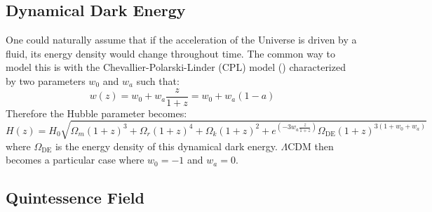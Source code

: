 \subsection{Dynamical Dark Energy}

One could naturally assume that if the acceleration of the Universe is driven by a fluid, its energy density would change throughout time. The common way to model this 
is with the Chevallier-Polarski-Linder (CPL) model (\cite{Chevallier_2001}) characterized by two parameters $w_0$ and $w_a$ such that:
\begin{equation}
    w(z) = w_0 + w_a \frac{z}{1+z} = w_0 + w_a(1-a)
\end{equation}
Therefore the Hubble parameter becomes:
\begin{equation}
    H(z) = H_0 \sqrt{\Omega_m(1+z)^3 + \Omega_r(1+z)^4 + \Omega_k(1+z)^2 + e^{\left( -3w_a\frac{z}{1+z} \right)} \Omega_{\text{DE}}(1+z)^{3(1+w_0+w_a)} }
\end{equation}
where $\Omega_{\text{DE}}$ is the energy density of this dynamical dark energy. $\Lambda$CDM then becomes a particular case where $w_0=-1$ and $w_a=0$.

\subsection{Quintessence Field}

